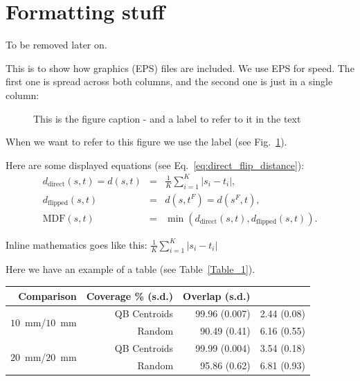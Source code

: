 \documentclass{bioinfo}
\begin{document}
\section*{Formatting stuff}

To be removed later on.

This is to show how graphics (EPS) files are included. We use EPS for
speed. The first one is spread across both columns, and the second one
is just in a single column:

\begin{figure}
\caption{This is the figure caption - and a label to refer to it in the text \label{Fig:big_picture}}

\end{figure}

When we want to refer to this figure we use the label (see
Fig.~\ref{Fig:big_picture}).


Here are some displayed equations (see Eq.~\ref{eq:direct_flip_distance}):
\begin{eqnarray}
  d_{\textrm{direct}}(s, t) = d(s, t) & = & \frac{1}{K}\sum_{i=1}^{K}|s_{i}-t_{i}|,\nonumber\\
  d_{\textrm{flipped}}(s, t) & = & d(s,t^F) = d(s^F,t),\nonumber\\
  \textrm{MDF}(s, t) & = & \min(d_{\textrm{direct}}(s, t), d_{\textrm{flipped}}(s, t))\label{eq:direct_flip_distance}.
\end{eqnarray}

Inline mathematics goes like this: $\frac{1}{K}\sum_{i=1}^{K}|s_{i}-t_{i}|$

Here we have an example of a table (see Table~\ref{Table_1}).

\begin{table}[th]  {\begin{tabular}{rrrr} %
Comparison & Coverage \% (s.d.) & Overlap (s.d.) \\ \hline
\multirow{2}{*}{$10$~mm/$10$~mm} & QB Centroids & 99.96 (0.007) & 2.44
(0.08)\\ & Random & 90.49 (0.41) & 6.16 (0.55)\\ \hline
\multirow{2}{*}{$20$~mm/$20$~mm} & QB Centroids & 99.99 (0.004) & 3.54
(0.18)\\ & Random & 95.86 (0.62) & 6.81 (0.93)\\ \hline
\end{tabular}}{}
\end{table}



%
%
%
%

\end{document}
